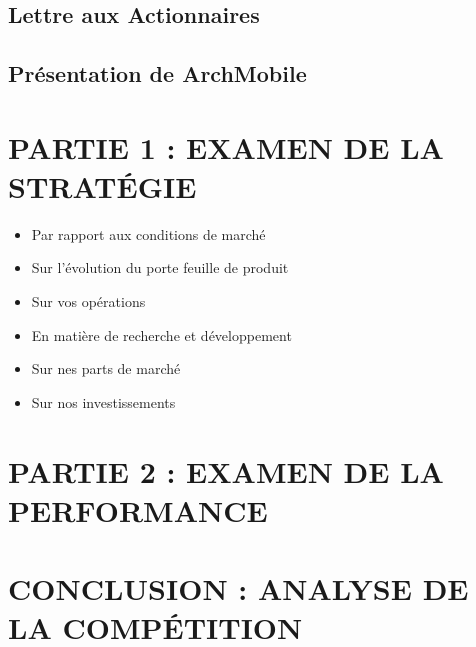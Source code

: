 \documentclass[a4paper]{article}
\begin{document}
\subsection{Lettre aux Actionnaires}

\subsection{Présentation de ArchMobile}


\section{PARTIE 1 : EXAMEN DE LA STRATÉGIE}
\begin{itemize}
\item Par rapport aux conditions de marché
\item Sur l'évolution du porte feuille de produit
\item Sur vos opérations
\item En matière de recherche et développement
\item Sur nes parts de marché
\item Sur nos investissements


\end{itemize}

\section{PARTIE 2 : EXAMEN DE LA PERFORMANCE}


\section{CONCLUSION : ANALYSE DE LA COMPÉTITION}
\end{document}
